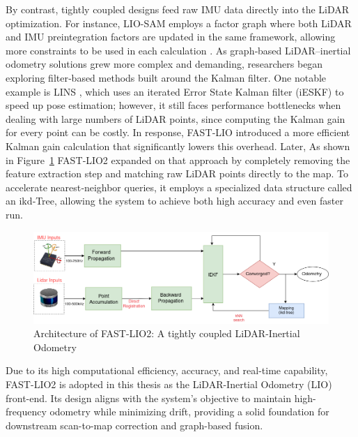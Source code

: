 By contrast, tightly coupled designs feed raw IMU data directly into the LiDAR optimization. For instance, LIO-SAM employs a factor graph where both LiDAR and IMU preintegration factors are updated in the same framework, allowing more constraints to be used in each calculation \cite{ShanEtAlLIOSAM2020}. As graph‐based LiDAR–inertial odometry solutions grew more complex and demanding, researchers began exploring filter‐based methods built around the Kalman filter. One notable example is LINS \cite{lins}, which uses an iterated Error State Kalman filter (iESKF) to speed up pose estimation; however, it still faces performance bottlenecks when dealing with large numbers of LiDAR points, since computing the Kalman gain for every point can be costly. In response, FAST‐LIO \cite{xuFastLIO2021} introduced a more efficient Kalman gain calculation that significantly lowers this overhead. Later, As shown in Figure~\ref{fig:fast_lio2_architecture} FAST‐LIO2 \cite{xuFastLIO2} expanded on that approach by completely removing the feature extraction step and matching raw LiDAR points directly to the map. To accelerate nearest‐neighbor queries, it employs a specialized data structure called an ikd‐Tree, allowing the system to achieve both high accuracy and even faster run.

\begin{figure}
    \centering
    \includegraphics[width=1 \linewidth]{images/fast_lio.drawio.png}
    \caption{Architecture of FAST-LIO2: A tightly coupled LiDAR-Inertial Odometry 
    	\cite{xuFastLIO2}}
    \label{fig:fast_lio2_architecture}
\end{figure}

Due to its high computational efficiency, accuracy, and real-time capability, FAST-LIO2 is adopted in this thesis as the LiDAR-Inertial Odometry (LIO) front-end. Its design aligns with the system’s objective to maintain high-frequency odometry while minimizing drift, providing a solid foundation for downstream scan-to-map correction and graph-based fusion.

